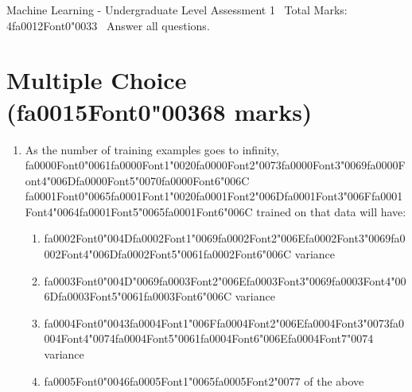 \documentclass[{\csname fa0013Font0\endcsname\char"0033}{\csname fa0014Font0\endcsname\char"0034}pt]{article}
\begin{document}
\begin{center}
Machine Learning - Undergraduate Level Assessment 1 \
Total Marks: 4{\csname fa0012Font0\endcsname\char"0033} \
Answer all questions.
\end{center}

\section*{Multiple Choice ({\csname fa0015Font0\endcsname\char"0036}8 marks)}
\begin{enumerate}[label=\arabic*.]
\item As the number of training examples goes to infinity, {\csname fa0000Font0\endcsname\char"0061}{\csname fa0000Font1\endcsname\char"0020}{\csname fa0000Font2\endcsname\char"0073}{\csname fa0000Font3\endcsname\char"0069}{\csname fa0000Font4\endcsname\char"006D}{\csname fa0000Font5\endcsname\char"0070}{\csname fa0000Font6\endcsname\char"006C} {\csname fa0001Font0\endcsname\char"0065}{\csname fa0001Font1\endcsname\char"0020}{\csname fa0001Font2\endcsname\char"006D}{\csname fa0001Font3\endcsname\char"006F}{\csname fa0001Font4\endcsname\char"0064}{\csname fa0001Font5\endcsname\char"0065}{\csname fa0001Font6\endcsname\char"006C} trained on that data will have:
\begin{enumerate}[label=(\alph*)]
    \item {\csname fa0002Font0\endcsname\char"004D}{\csname fa0002Font1\endcsname\char"0069}{\csname fa0002Font2\endcsname\char"006E}{\csname fa0002Font3\endcsname\char"0069}{\csname fa0002Font4\endcsname\char"006D}{\csname fa0002Font5\endcsname\char"0061}{\csname fa0002Font6\endcsname\char"006C} variance
    \item {\csname fa0003Font0\endcsname\char"004D}{\char"0069}{\csname fa0003Font2\endcsname\char"006E}{\csname fa0003Font3\endcsname\char"0069}{\csname fa0003Font4\endcsname\char"006D}{\csname fa0003Font5\endcsname\char"0061}{\csname fa0003Font6\endcsname\char"006C} variance
    \item {\csname fa0004Font0\endcsname\char"0043}{\csname fa0004Font1\endcsname\char"006F}{\csname fa0004Font2\endcsname\char"006E}{\csname fa0004Font3\endcsname\char"0073}{\csname fa0004Font4\endcsname\char"0074}{\csname fa0004Font5\endcsname\char"0061}{\csname fa0004Font6\endcsname\char"006E}{\csname fa0004Font7\endcsname\char"0074} variance
    \item {\csname fa0005Font0\endcsname\char"0046}{\csname fa0005Font1\endcsname\char"0065}{\csname fa0005Font2\endcsname\char"0077} of the above

\end{enumerate}
\end{enumerate}
\end{document}
